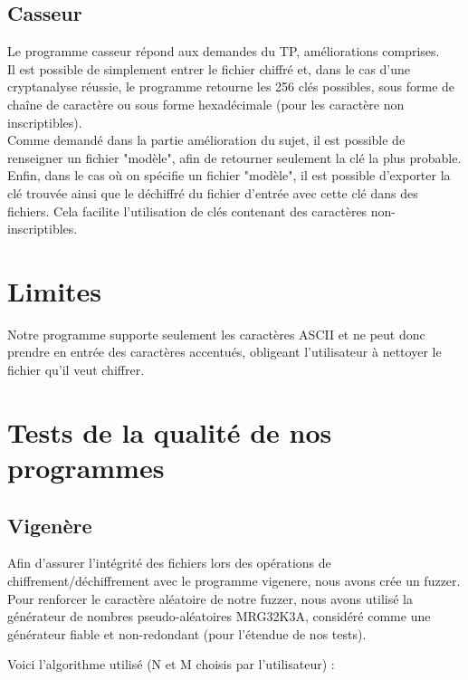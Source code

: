 \documentclass[a4paper, 11pt, oneside]{article}
\begin{document}
\subsection{Casseur}

Le programme casseur répond aux demandes du TP, améliorations comprises.\\
Il est possible de simplement entrer le fichier chiffré et, dans le cas d'une cryptanalyse réussie, le programme retourne les 256 clés possibles, sous forme de chaîne de caractère ou sous forme hexadécimale (pour les caractère non inscriptibles).\\
Comme demandé dans la partie amélioration du sujet, il est possible de renseigner un fichier "modèle", afin de retourner seulement la clé la plus probable.\\
Enfin, dans le cas où on spécifie un fichier "modèle", il est possible d'exporter la clé trouvée ainsi que le déchiffré du fichier d'entrée avec cette clé dans des fichiers. Cela facilite l'utilisation de clés contenant des caractères non-inscriptibles.

\section{Limites}

Notre programme supporte seulement les caractères ASCII et ne peut donc prendre en entrée des caractères accentués, obligeant l'utilisateur à nettoyer le fichier qu'il veut chiffrer.

\section{Tests de la qualité de nos programmes}

\subsection{Vigenère}

Afin d'assurer l'intégrité des fichiers lors des opérations de chiffrement/déchiffrement avec le programme vigenere, nous avons crée un fuzzer.\\
Pour renforcer le  caractère aléatoire de notre fuzzer, nous avons utilisé la générateur de nombres pseudo-aléatoires MRG32K3A, considéré comme une générateur fiable et non-redondant (pour l'étendue de nos tests).

Voici l'algorithme utilisé (N et M choisis par l'utilisateur) :\\
\end{document}
